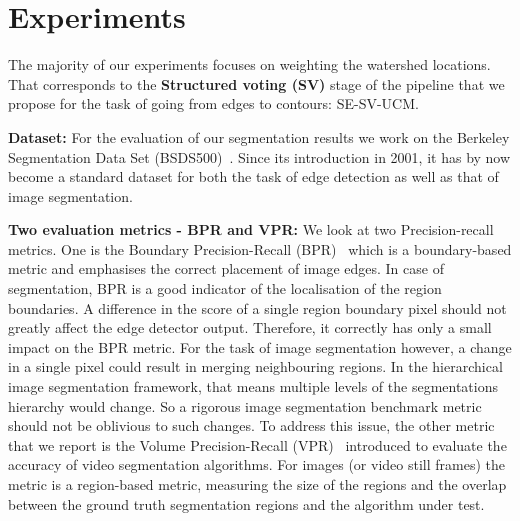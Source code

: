 \chapter{Experiments} %
\label{Chapter5}
The majority of our experiments focuses on weighting the watershed locations. That corresponds to the \textbf{Structured voting (SV)} stage of the pipeline that we propose for the task of going from edges to contours: SE-SV-UCM.

\textbf{Dataset:} For the evaluation of our segmentation results we work on the Berkeley Segmentation Data Set (BSDS500)~\cite{Arbelaez11}. Since its introduction in 2001, it has by now become a standard dataset for both the task of edge detection as well as that of image segmentation.

\textbf{Two evaluation metrics - BPR and VPR:} We look at two Precision-recall metrics. One is the Boundary Precision-Recall (BPR)~\cite{Arbelaez11} which is a boundary-based metric and emphasises the correct placement of image edges. In case of segmentation, BPR is a good indicator of the localisation of the region boundaries. A difference in the score of a single region boundary pixel should not greatly affect the edge detector output. Therefore, it correctly has only a small impact on the BPR metric. For the task of image segmentation however, a change in a single pixel could result in merging neighbouring regions. In the hierarchical image segmentation framework, that means multiple levels of the segmentations hierarchy would change. So a rigorous image segmentation benchmark metric should not be oblivious to such changes. To address this issue, the other metric that we report is the Volume Precision-Recall (VPR)~\cite{Galasso13} introduced to evaluate the accuracy of video segmentation algorithms. For images (or video still frames) the metric is a region-based metric, measuring the size of the regions and the overlap between the ground truth segmentation regions and the algorithm under test.

